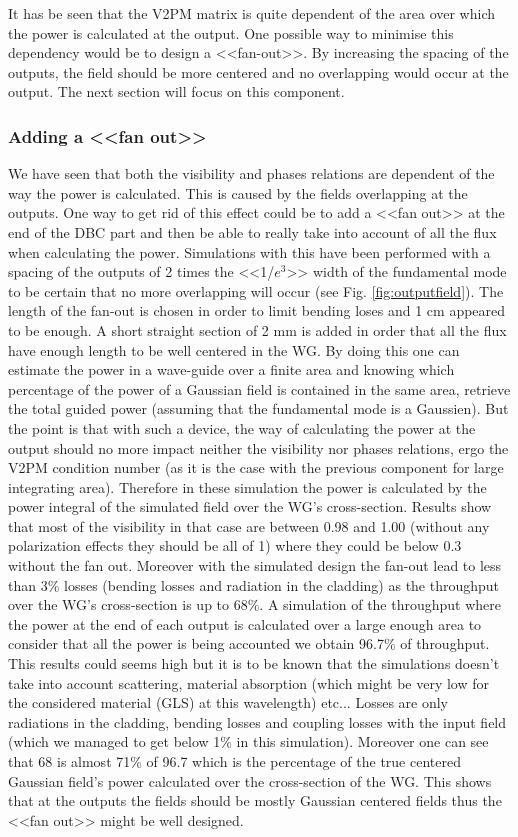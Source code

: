 It has be seen that the V2PM matrix is quite dependent of the area
over which the power is calculated at the output. One possible way to
minimise this dependency would be to design a <<fan-out>>. By
increasing the spacing of the outputs, the field should be more
centered and no overlapping would occur at the output. The next section
will focus on this component.

\subsubsection{Adding a <<fan out>>}
We have seen that both the visibility and phases relations are
dependent of the way the power is calculated. This is caused by the
fields overlapping at the outputs. One way to get rid of this effect
could be to add a <<fan out>> at the end of the DBC part and then be able to really take into account of all the flux when calculating the power. Simulations
with this have been performed with a spacing of the outputs of 2 times
the <<1/$e^3$>> width of the fundamental mode to be certain that no
more overlapping will occur (see Fig. \ref{fig:outputfield}). The length of the fan-out is chosen in order to limit bending loses and 1 cm appeared to be enough. A short straight section of 2 mm is added in order that all the flux have enough length to be well centered in the WG. By doing this one can estimate the
power in a wave-guide over a finite area and knowing which percentage
of the power of a Gaussian field is contained in the same area,
retrieve the total guided power (assuming that the fundamental mode is a Gaussien). But the point is that with such a
device, the way of calculating the power at the output should no more
impact neither the visibility nor phases relations, ergo the V2PM condition number (as it is the case with the previous component for large integrating area).
Therefore in these simulation the power is calculated by the power
integral of the simulated field over the WG's cross-section.
Results show that most of the visibility in that case are between
0.98 and 1.00 (without any polarization effects they should be all of
1) where they could be below 0.3 without the fan out.
Moreover with the simulated design the fan-out lead to less than 3\%
losses (bending losses and radiation in the cladding) as the
throughput over the WG's cross-section is up to 68\%.
A simulation of the throughput where the power at the end of each
output is calculated over a large enough area to consider that all the
power is being accounted we obtain 96.7\% of throughput. This results
could seems high but it is to be known that the simulations doesn't
take into account scattering, material absorption (which might be very
low for the considered material (GLS) at this wavelength) etc... Losses are only radiations in
the cladding, bending losses and coupling losses with the input field
(which we managed to get below 1\% in this simulation).
Moreover one can see that 68 is almost 71\% of 96.7 which is the
percentage of the true centered Gaussian field's power calculated over
the cross-section of the WG. This shows that at the outputs the fields
should be mostly Gaussian centered fields thus the <<fan out>> might be well designed.


